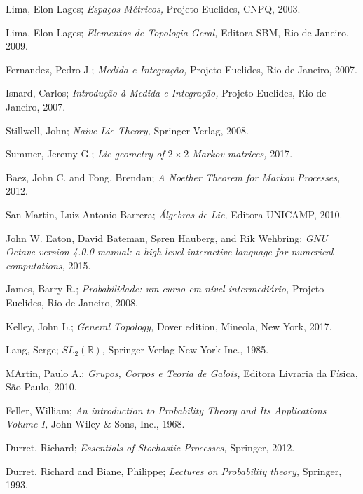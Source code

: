 \documentclass[twoside,openright,titlepage,numbers=noenddot,headinclude,  lineheaders footinclude=true,cleardoublepage=empty,
                                BCOR=5mm,paper=a4,fontsize=12pt ]{scrbook}
\theoremstyle{definition}
\begin{document}
\begin{thebibliography}{9999}  

Lima, Elon Lages;
\emph{Espaços Métricos, }Projeto Euclides, CNPQ, 2003.

Lima, Elon Lages;
\emph{Elementos de Topologia Geral, }Editora SBM, Rio de Janeiro, 2009.

Fernandez, Pedro J.;
\emph{Medida e Integração, }Projeto Euclides, Rio de Janeiro, 2007.

Isnard, Carlos;
\emph{Introdução à Medida e Integração, }Projeto Euclides, Rio de Janeiro, 2007.

Stillwell, John;
\emph{Naive Lie Theory, }Springer Verlag, 2008.

Summer, Jeremy G.;
\emph{Lie geometry of $2 \times 2$ Markov matrices, }2017.

Baez, John C. and Fong, Brendan;
\emph{A Noether Theorem for Markov Processes, }2012.

San Martin, Luiz Antonio Barrera;
\emph{Álgebras de Lie, }Editora UNICAMP, 2010.

 {John W. Eaton, David Bateman, S{\o}ren Hauberg, and Rik Wehbring};
\emph{{GNU Octave} version 4.0.0 manual: a high-level interactive language for numerical computations, } 2015.

James, Barry R.;
\emph{Probabilidade: um curso em nível intermediário, }Projeto Euclides, Rio de Janeiro, 2008.

Kelley, John L.;
\emph{General Topology, }Dover edition, Mineola, New York, 2017.

Lang, Serge;
\emph{$SL_2(\mathbb{R})$, }Springer-Verlag New York Inc., 1985.

MArtin, Paulo A.;
\emph{Grupos, Corpos e Teoria de Galois, } Editora Livraria da Física, São Paulo, 2010.

Feller, William;
\emph{An introduction to Probability Theory and Its Applications Volume I, }John Wiley \& Sons, Inc.,  1968.

Durret, Richard;
\emph{Essentials of Stochastic Processes, }Springer,  2012.

Durret, Richard and  Biane, Philippe;
\emph{Lectures on Probability theory, }Springer,  1993.


\end{thebibliography}
\end{document}
